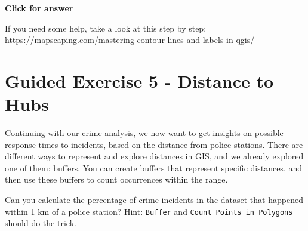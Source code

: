 \documentclass[
  letterpaper,
  DIV=11,
  numbers=noendperiod]{scrreprt}
\begin{document}
\begin{tcolorbox}[enhanced jigsaw, leftrule=.75mm, colframe=quarto-callout-important-color-frame, breakable, toprule=.15mm, bottomrule=.15mm, arc=.35mm, rightrule=.15mm, opacityback=0, colback=white, left=2mm]

\vspace{-3mm}\textbf{Click for answer}\vspace{3mm}

If you need some help, take a look at this step by step:
\url{https://mapscaping.com/mastering-contour-lines-and-labels-in-qgis/}

\end{tcolorbox}

\section{Guided Exercise 5 - Distance to
Hubs}\label{guided-exercise-5---distance-to-hubs}

Continuing with our crime analysis, we now want to get insights on
possible response times to incidents, based on the distance from police
stations. There are different ways to represent and explore distances in
GIS, and we already explored one of them: buffers. You can create
buffers that represent specific distances, and then use these buffers to
count occurrences within the range.

\begin{tcolorbox}[enhanced jigsaw, breakable, toptitle=1mm, colback=white, left=2mm, leftrule=.75mm, titlerule=0mm, colframe=quarto-callout-important-color-frame, opacityback=0, title=\textcolor{quarto-callout-important-color}{\faExclamation}\hspace{0.5em}{Stop and Think}, toprule=.15mm, opacitybacktitle=0.6, bottomtitle=1mm, colbacktitle=quarto-callout-important-color!10!white, bottomrule=.15mm, coltitle=black, rightrule=.15mm, arc=.35mm]

Can you calculate the percentage of crime incidents in the dataset that
happened within 1 km of a police station? Hint: \texttt{Buffer} and
\texttt{Count\ Points\ in\ Polygons} should do the trick.

\end{tcolorbox}
\end{document}
